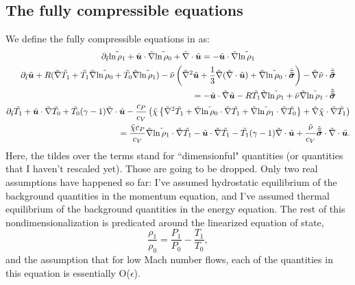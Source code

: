 \subsection{The fully compressible equations}
We define the fully compressible equations in \citet{anders&brown2017} as:
\begin{gather}
\partial_{\tilde{t}} \tilde{\ln \rho_1} + \tilde{\bm{u}}\cdot\tilde{\nabla} \tilde{\ln\rho_0} + \tilde{\nabla}\cdot\tilde{\bm{u}} = -\tilde{\bm{u}}\cdot\tilde{\nabla}\tilde{\ln\rho_1} 
\label{eqn:unscaled_continuity}
\\
\begin{split}
\partial_{\tilde{t}} \tilde{\bm{u}} + R(\tilde{\nabla} \tilde{T_1} + \tilde{T_1} \tilde{\nabla}\tilde{\ln\rho_0} + \tilde{T_0} \tilde{\nabla}\tilde{\ln\rho_1})
- \tilde{\nu}\left(\tilde{\nabla}^2 \tilde{\bm{u}} + \frac{1}{3}\tilde{\nabla}(\tilde{\nabla}\cdot\tilde{\bm{u}}) + \tilde{\nabla}\tilde{\ln\rho_0}\cdot\tilde{\bm{\bar{\bar{\sigma}}}}\right)
- \tilde{\nabla}\tilde{\nu}\cdot\tilde{\bm{\bar{\bar{\sigma}}}}
\\= -\tilde{\bm{u}}\cdot\tilde{\nabla}\tilde{\bm{u}} - R\tilde{T_1}\tilde{\nabla}\tilde{\ln\rho_1} + \tilde{\nu}\tilde{\nabla}\tilde{\ln\rho_1}\cdot\tilde{\bm{\bar{\bar{\sigma}}}}
\end{split}
\label{eqn:unscaled_momentum}
\\
\begin{split}
\partial_{\tilde{t}} \tilde{T_1} + \tilde{\bm{u}}\cdot\tilde{\nabla} \tilde{T_0} + \tilde{T_0}(\gamma-1)\tilde{\nabla}\cdot\tilde{\bm{u}} 
- \frac{c_P}{c_V}\left(\tilde{\chi}\left\{\tilde{\nabla}^2 \tilde{T_1} + \tilde{\nabla}\tilde{\ln\rho_0} \cdot\tilde{\nabla} \tilde{T_1} + \tilde{\nabla}\tilde{\ln\rho_1}\cdot\tilde{\nabla} \tilde{T_0}\right\} 
+ \tilde{\nabla}\tilde{\chi}\cdot\tilde{\nabla} \tilde{T_1}\right)
\\= \frac{\tilde{\chi}c_P}{c_V}\tilde{\nabla}\tilde{\ln\rho_1}\cdot\tilde{\nabla} \tilde{T_1} - \tilde{\bm{u}}\cdot\tilde{\nabla} \tilde{T_1} - \tilde{T_1}(\gamma-1)\tilde{\nabla}\cdot\tilde{\bm{u}}
+ \frac{\tilde{\nu}}{c_V}\tilde{\bm{\bar{\bar{\sigma}}}}\cdot\tilde{\nabla}\cdot\tilde{\bm{u}}.
\end{split}
\label{eqn:unscaled_energy}
\end{gather}
Here, the tildes over the terms stand for ``dimensionful" quantities (or quantities that I haven't rescaled yet). 
Those are going to be dropped. 
Only two real assumptions have happened so far: I've assumed hydrostatic equilibrium of the background quantities in the momentum equation, and I've assumed thermal equilibrium of the background quantities in the energy equation.
The rest of this nondimensionalization is predicated around the linearized equation of state,
$$
\frac{\rho_1}{\rho_0} = \frac{P_1}{P_0} - \frac{T_1}{T_0},
$$
and the assumption that for low Mach number flows, each of the quantities in this equation is essentially O($\epsilon$).
